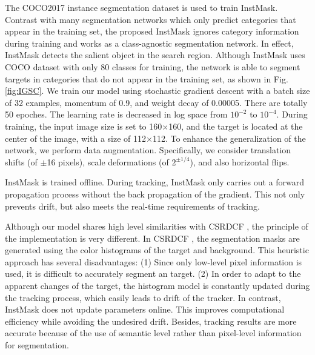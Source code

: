 \documentclass[review]{elsarticle}
\begin{document}
\begin{CJK*}{UTF8}{gbsn}
The COCO2017 \cite{Lin2014MicrosoftCC} instance segmentation dataset is used to train InstMask.
Contrast with many segmentation networks which only predict categories that appear in the training set, the proposed InstMask ignores category information during training and works as a class-agnostic segmentation network. In effect, InstMask detects the salient object in the search region. Although InstMask uses COCO dataset \cite{Lin2014MicrosoftCC} with only 80 classes for training, the network is able to segment targets in categories that do not appear in the training set, as shown in Fig. \ref{fig:IGSC}.
We train our model using stochastic gradient descent with a batch size of 32 examples, momentum of 0.9, and weight decay of 0.00005. There are totally 50 epoches. The learning rate is decreased in log space from $10^{-2}$ to $10^{-4}$. During training, the input image size is set to 160$\times$160, and the target is located at the center of the image, with a size of 112$\times$112. To enhance the generalization of the network, we perform data augmentation. Specifically, we consider translation shifts (of $\pm$16 pixels), scale deformations (of $2^{\pm 1/4}$), and also horizontal flips.

InstMask is trained offline. During tracking, InstMask only carries out a forward propagation process without the back propagation of the gradient. This not only prevents drift, but also meets the real-time requirements of tracking.

Although our model shares high level similarities with CSRDCF \cite{Lukezic2017DiscriminativeCF}, the principle of the implementation is very different.
In CSRDCF \cite{Lukezic2017DiscriminativeCF}, the segmentation masks are generated using the color histograms of the target and background. This heuristic approach has several disadvantages: (1) Since only low-level pixel information is used, it is difficult to accurately segment an target. (2) In order to adapt to the apparent changes of the target, the histogram model is constantly updated during the tracking process, which easily leads to drift of the tracker. In contrast, InstMask does not update parameters online. This improves computational efficiency while avoiding the undesired drift. Besides, tracking results are more accurate because of the use of semantic level rather than pixel-level information for segmentation.


\end{CJK*}
\end{document}
